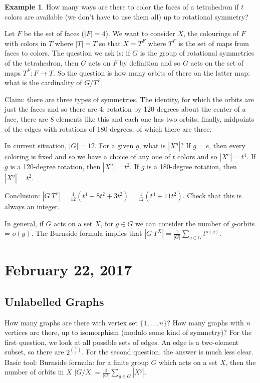 \documentclass[12pt]{article}
\theoremstyle{definition}
\newtheorem{exmp}{Example}[section]
\begin{document}
\begin{exmp}
    How many ways are there to color the faces of a tetrahedron if $t$ colors
    are available (we don't have to use them all) up to rotational symmetry?

    Let $F$ be the set of faces ($|F| = 4$). We want to consider $X$, the
    colourings of $F$ with colors in $T$ where $|T| = T$ so that $X = T^F$
    where $T^F$ is the set of maps from faces to colors. The question we ask
    is: if $G$ is the group of rotational symmetries of the tetrahedron, then
    $G$ acts on $F$ by definition and so $G$ acts on the set of maps $T^F: F
    \rightarrow T$. So the question is how many orbits of there on the latter
    map: what is the cardinality of $G/T^F$.

    Claim: there are three types of symmetries. The identity, for which the
    orbits are just the faces and so there are 4; rotation by 120 degrees about
    the center of a face, there are 8 elements like this and each one has two
    orbits; finally, midpoints of the edges with rotations of 180-degrees, of
    which there are three.

    In current situation, $|G| = 12$. For a given $g$, what is $|X^g|$? If $g =
    e$, then every coloring is fixed and so we have a choice of any one of $t$
    colors and so $|X^e| = t^4$. If $g$ is a 120-degree rotation, then $|X^g| =
    t^2$. If $g$ is a 180-degree rotation, then $|X^g| = t^2$.

    Conclusion: $|G \ T^F| = \frac{1}{12} (t^4 + 8t^2 + 3t^2) = \frac{1}{12}
    (t^4 + 11t^2)$. Check that this is always an integer.
\end{exmp}

In general, if $G$ acts on a set $X$, for $g \in G$ we can consider the number
of $g$-orbits = $o(g)$. The Burnside formula implies that $|G \ T^X| =
\frac{1}{|G|} \sum_{g \in G} t^{o(g)}$.

\section{February 22, 2017}

\subsection{Unlabelled Graphs}

How many graphs are there with vertex set $\{1, \ldots, n\}$? How many graphs
with $n$ vertices are there, up to isomorphism (modulo some kind of symmetry)?
For the first question, we look at all possible sets of edges. An edge is a
two-element subset, so there are $2^{n \choose 2}$. For the second question,
the answer is much less clear. Basic tool: Burnside formula: for a finite group
$G$ which acts on a set $X$, then the number of orbits in $X$ $|G/X| =
\frac{1}{|G|} \sum_{g \in G} |X^g|$.
\end{document}
